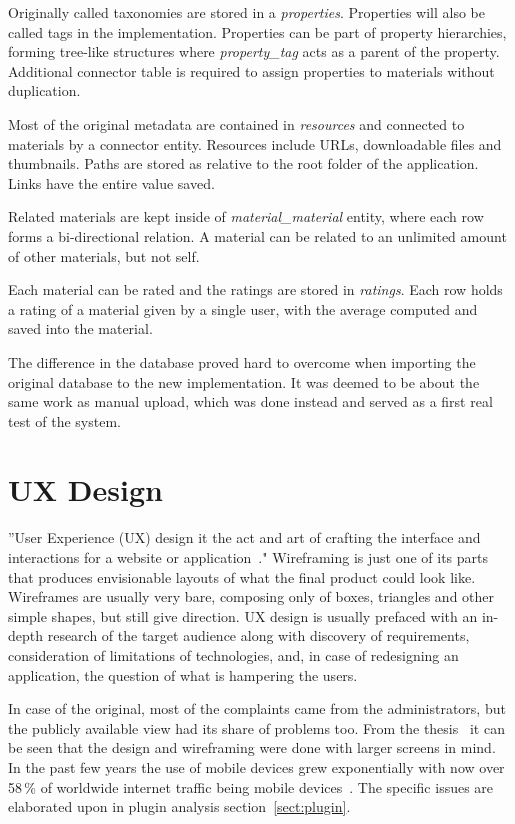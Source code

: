 \documentclass[
  digital,     %
  oneside,     %
  nosansbold,  %
  colorbold, %
  lof,         %
  lot,         %
]{fithesis4}
\begin{document}
Originally called  taxonomies are stored in a \textit{properties}. Properties will also be called tags in the implementation. Properties can be part of property hierarchies, forming tree-like structures where \textit{property\_tag} acts as a parent of the property. Additional connector table is required to assign properties to materials without duplication.

Most of the original metadata are contained in \textit{resources} and connected to materials by a connector entity. Resources include URLs, downloadable files and thumbnails. Paths are stored as relative to the root folder of the application. Links have the entire value saved.

Related materials are kept inside of \textit{material\_material} entity, where each row forms a bi-directional relation. A material can be related to an unlimited amount of other materials, but not self.

Each material can be rated and the ratings are stored in \textit{ratings}. Each row holds a rating of a material given by a single user, with the average computed and saved into the material.

The difference in the database proved hard to overcome when importing the original database to the new implementation. It was deemed to be about the same work as manual upload, which was done instead and served as a first real test of the system.

\section{UX Design}

”User Experience (UX) design it the act and art of crafting the interface and interactions for a website or application~\cite{hamm14}." Wireframing is just one of its parts that produces envisionable layouts of what the final product could look like. Wireframes are usually very bare, composing only of boxes, triangles and other simple shapes, but still give direction. UX design is usually prefaced with an in-depth research of the target audience along with discovery of requirements, consideration of limitations of technologies, and, in case of redesigning an application, the question of what is hampering the users.

In case of the original, most of the complaints came from the administrators, but the publicly available view had its share of problems too. From the thesis~\cite{lang18} it can be seen that the design and wireframing were done with larger screens in mind. In the past few years the use of mobile devices grew exponentially with now over 58\,\% of worldwide internet traffic being mobile devices~\cite{mobile_usage}. The specific issues are elaborated upon in plugin analysis section~\ref{sect:plugin}.
\end{document}
